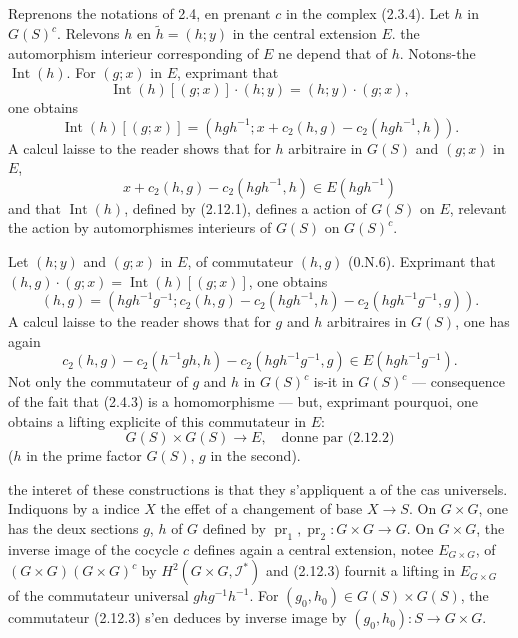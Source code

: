 \documentclass[11pt,a4paper]{article}
\theoremstyle{plain}
\theoremstyle{definition}
\DeclareMathOperator{\Int}{Int}
\DeclareMathOperator{\pr}{pr}
\begin{document}
\subsection{}\label{2.12}

Reprenons the notations of 2.4, en prenant $c$ in the complex (2.3.4). Let $h$ in $G(S)^c$. Relevons $h$ en $\tilde{h} = (h; y)$ in the central extension $E$. the automorphism interieur corresponding of $E$ ne depend that of $h$. Notons-the $\Int(h)$. For $(g; x)$ in $E$, exprimant that
\[
\Int(h)[(g; x)] \cdot (h; y) = (h; y) \cdot (g; x),
\]
one obtains
\begin{equation}\label{2.12.1}
\Int(h)[(g; x)] = (hgh^{-1}; x + c_2(h, g) - c_2(hgh^{-1}, h)).
\end{equation}
A calcul laisse to the reader shows that for $h$ arbitraire in $G(S)$ and $(g; x)$ in $E$,
\[
x + c_2(h, g) - c_2(hgh^{-1}, h) \in E(hgh^{-1})
\]
and that $\Int(h)$, defined by (2.12.1), defines a action of $G(S)$ on $E$, relevant the action by automorphismes interieurs of $G(S)$ on $G(S)^c$.

Let $(h; y)$ and $(g; x)$ in $E$, of commutateur $(h, g)$ (0.N.6). Exprimant that $(h, g) \cdot (g; x) = \Int(h)[(g; x)]$, one obtains
\begin{equation}\label{2.12.2}
(h, g) = (hgh^{-1}g^{-1}; c_2(h, g) - c_2(hgh^{-1}, h) - c_2(hgh^{-1}g^{-1}, g)).
\end{equation}
A calcul laisse to the reader shows that for $g$ and $h$ arbitraires in $G(S)$, one has again
\[
c_2(h, g) - c_2(h^{-1}gh, h) - c_2(hgh^{-1}g^{-1}, g) \in E(hgh^{-1}g^{-1}).
\]
Not only the commutateur of $g$ and $h$ in $G(S)^c$ is-it in $G(S)^c$ --- consequence of the fait that (2.4.3) is a homomorphisme --- but, exprimant pourquoi, one obtains a lifting explicite of this commutateur in $E$:
\begin{equation}\label{2.12.3}
G(S) \times G(S) \to E, \quad \text{donne par (2.12.2)}
\end{equation}
($h$ in the prime factor $G(S)$, $g$ in the second).

the interet of these constructions is that they s'appliquent a of the cas universels. Indiquons by a indice $X$ the effet of a changement of base $X \to S$. On $G \times G$, one has the deux sections $g$, $h$ of $G$ defined by $\pr_1, \pr_2 : G \times G \to G$. On $G \times G$, the inverse image of the cocycle $c$ defines again a central extension, notee $E_{G \times G}$, of $(G \times G)(G \times G)^c$ by $H^2(G \times G, \mathscr{I}^*)$ and (2.12.3) fournit a lifting in $E_{G \times G}$ of the commutateur universal $ghg^{-1}h^{-1}$. For $(g_0, h_0) \in G(S) \times G(S)$, the commutateur (2.12.3) s'en deduces by inverse image by $(g_0, h_0) : S \to G \times G$.
\end{document}
